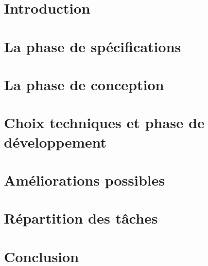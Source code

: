 \documentclass[a4paper,12pt]{report}
\begin{document}
\tableofcontents

\chapter*{Introduction}


\chapter{La phase de spécifications}


\chapter{La phase de conception}


\chapter{Choix techniques et phase de développement}


\chapter{Améliorations possibles}


\chapter{Répartition des tâches}


\chapter*{Conclusion}

\end{document}
